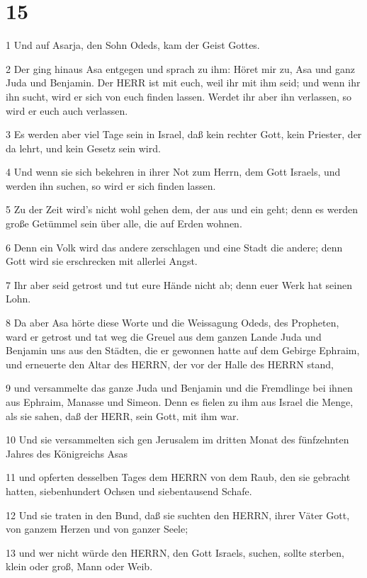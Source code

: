 \chapter{15}

\par 1 Und auf Asarja, den Sohn Odeds, kam der Geist Gottes.
\par 2 Der ging hinaus Asa entgegen und sprach zu ihm: Höret mir zu, Asa und ganz Juda und Benjamin. Der HERR ist mit euch, weil ihr mit ihm seid; und wenn ihr ihn sucht, wird er sich von euch finden lassen. Werdet ihr aber ihn verlassen, so wird er euch auch verlassen.
\par 3 Es werden aber viel Tage sein in Israel, daß kein rechter Gott, kein Priester, der da lehrt, und kein Gesetz sein wird.
\par 4 Und wenn sie sich bekehren in ihrer Not zum Herrn, dem Gott Israels, und werden ihn suchen, so wird er sich finden lassen.
\par 5 Zu der Zeit wird's nicht wohl gehen dem, der aus und ein geht; denn es werden große Getümmel sein über alle, die auf Erden wohnen.
\par 6 Denn ein Volk wird das andere zerschlagen und eine Stadt die andere; denn Gott wird sie erschrecken mit allerlei Angst.
\par 7 Ihr aber seid getrost und tut eure Hände nicht ab; denn euer Werk hat seinen Lohn.
\par 8 Da aber Asa hörte diese Worte und die Weissagung Odeds, des Propheten, ward er getrost und tat weg die Greuel aus dem ganzen Lande Juda und Benjamin uns aus den Städten, die er gewonnen hatte auf dem Gebirge Ephraim, und erneuerte den Altar des HERRN, der vor der Halle des HERRN stand,
\par 9 und versammelte das ganze Juda und Benjamin und die Fremdlinge bei ihnen aus Ephraim, Manasse und Simeon. Denn es fielen zu ihm aus Israel die Menge, als sie sahen, daß der HERR, sein Gott, mit ihm war.
\par 10 Und sie versammelten sich gen Jerusalem im dritten Monat des fünfzehnten Jahres des Königreichs Asas
\par 11 und opferten desselben Tages dem HERRN von dem Raub, den sie gebracht hatten, siebenhundert Ochsen und siebentausend Schafe.
\par 12 Und sie traten in den Bund, daß sie suchten den HERRN, ihrer Väter Gott, von ganzem Herzen und von ganzer Seele;
\par 13 und wer nicht würde den HERRN, den Gott Israels, suchen, sollte sterben, klein oder groß, Mann oder Weib.

